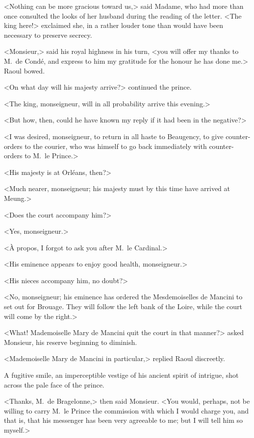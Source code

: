 <Nothing can be more gracious toward us,> said Madame, who had more than once consulted the looks of her husband during the reading of the letter. <The king here!> exclaimed she, in a rather louder tone than would have been necessary to preserve secrecy.

<Monsieur,> said his royal highness in his turn, <you will offer my thanks to M.~de Condé, and express to him my gratitude for the honour he has done me.> Raoul bowed.

<On what day will his majesty arrive?> continued the prince.

<The king, monseigneur, will in all probability arrive this evening.>

<But how, then, could he have known my reply if it had been in the negative?>

<I was desired, monseigneur, to return in all haste to Beaugency, to give counter-orders to the courier, who was himself to go back immediately with counter-orders to M.~le Prince.>

<His majesty is at Orléans, then?>

<Much nearer, monseigneur; his majesty must by this time have arrived at Meung.>

<Does the court accompany him?>

<Yes, monseigneur.>

<À propos, I forgot to ask you after M.~le Cardinal.>

<His eminence appears to enjoy good health, monseigneur.>

<His nieces accompany him, no doubt?>

<No, monseigneur; his eminence has ordered the Mesdemoiselles de Mancini to set out for Brouage. They will follow the left bank of the Loire, while the court will come by the right.>

<What! Mademoiselle Mary de Mancini quit the court in that manner?> asked Monsieur, his reserve beginning to diminish.

<Mademoiselle Mary de Mancini in particular,> replied Raoul discreetly.

A fugitive smile, an imperceptible vestige of his ancient spirit of intrigue, shot across the pale face of the prince.

<Thanks, M.~de Bragelonne,> then said Monsieur. <You would, perhaps, not be willing to carry M.~le Prince the commission with which I would charge you, and that is, that his messenger has been very agreeable to me; but I will tell him so myself.>

